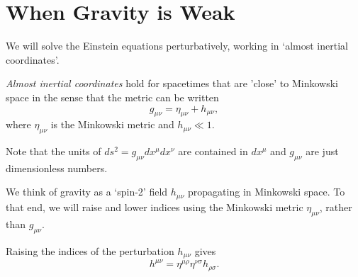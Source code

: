 \chapter{When Gravity is Weak}%
\label{cha:when_gravity_is_weak}

We will solve the Einstein equations perturbatively, working in `almost inertial coordinates'.
\begin{definition}[]
  \emph{Almost inertial coordinates} hold for spacetimes that are 'close' to Minkowski space in the sense that the metric can be written
  \begin{equation}
    g_{\mu\nu} = \eta_{\mu\nu} + h_{\mu\nu},
  \end{equation}
  where $\eta_{\mu\nu}$ is the Minkowski metric and $h_{\mu\nu} \ll 1$.
\end{definition}
\begin{leftbar}
  \begin{note}
    Note that the units of $ds^2 = g_{\mu\nu} dx^{\mu} dx^{\nu}$ are contained in $dx^{\mu}$ and $g_{\mu\nu}$ are just dimensionless numbers.
  \end{note}
\end{leftbar}
We think of gravity as a `spin-2' field $h_{\mu\nu}$ propagating in Minkowski space. To that end, we will raise and lower indices using the Minkowski metric $\eta_{\mu\nu}$, rather than $g_{\mu\nu}$.
\begin{example}[]
  Raising the indices of the perturbation $h_{\mu\nu}$ gives
  \begin{equation}
    h^{\mu\nu} = \eta^{\mu\rho} \eta^{\nu\sigma} h_{\rho\sigma}.
  \end{equation}
\end{example}
